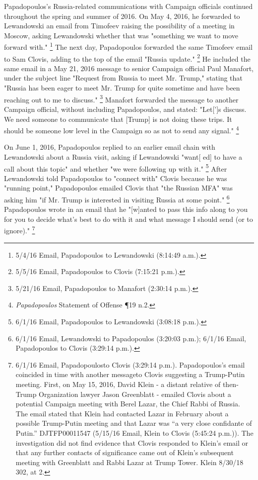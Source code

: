 Papadopoulos's Russia-related communications with Campaign officials continued throughout the spring and summer of 2016.
On May 4, 2016, he forwarded to Lewandowski an email from Timofeev raising the possibility of a meeting in Moscow, asking Lewandowski whether that was "something we want to move forward with."%
\footnote{5/4/16 Email, Papadopoulos to Lewandowski (8:14:49 a.m.).}
The next day, Papadopoulos forwarded the same Timofeev email to Sam Clovis, adding to the top of the email "Russia update."%
\footnote{5/5/16 Email, Papadopoulos to Clovis (7:15:21 p.m.).}
He included the same email in a May 21, 2016 message to senior Campaign official Paul Manafort, under the subject line "Request from Russia to meet Mr. Trump," stating that "Russia has been eager to meet Mr. Trump for quite sometime and have been reaching out to me to discuss."%
\footnote{5/21/16 Email, Papadopoulos to Manafort (2:30:14 p.m.).}
Manafort forwarded the message to another Campaign official, without including Papadopoulos, and stated: "Let[']s discuss.
We need someone to communicate that [Trump] is not doing these trips.
It should be someone low level in the Campaign so as not to send any signal."%
\footnote{\textit{Papadopoulos} Statement of Offense \P 19 n.2.}

On June 1, 2016, Papadopoulos replied to an earlier email chain with Lewandowski about a Russia visit, asking if Lewandowski "want[ ed] to have a call about this topic" and whether "we were following up with it."%
\footnote{6/1/16 Email, Papadopoulos to Lewandowski (3:08:18 p.m.).}
After Lewandowski told Papadopoulos to "connect with" Clovis because he was "running point," Papadopoulos emailed Clovis that "the Russian MFA" was asking him "if Mr. Trump is interested in visiting Russia at some point."%
\footnote{6/1/16 Email, Lewandowski to Papadopoulos (3:20:03 p.m.);
6/1/16 Email, Papadopoulos to Clovis (3:29:14 p.m.).}
Papadopoulos wrote in an email that he "[w]anted to pass this info along to you for you to decide what's best to do with it and what message I should send (or to ignore)."%
\footnote{6/1/16 Email, Papadopoulosto Clovis (3:29:14 p.m.).
Papadopoulos’s email coincided in time with another messageto Clovis suggesting a Trump-Putin meeting.
First, on May 15, 2016, David Klein - a distant relative of then-Trump Organization lawyer Jason Greenblatt - emailed Clovis about a potential Campaign meeting with Berel Lazar, the Chief Rabbi of Russia.
The email stated that Klein had contacted Lazar in February about a possible Trump-Putin meeting and that Lazar was “a very close confidante of Putin.”
DJTFP00011547 (5/15/16 Email, Klein to Clovis (5:45:24 p.m.)).
The investigation did not find evidence that Clovis responded to Klein’s email or that any further contacts of significance came out of Klein’s subsequent meeting with Greenblatt and Rabbi Lazar at Trump Tower.
Klein 8/30/18 302, at 2.}

